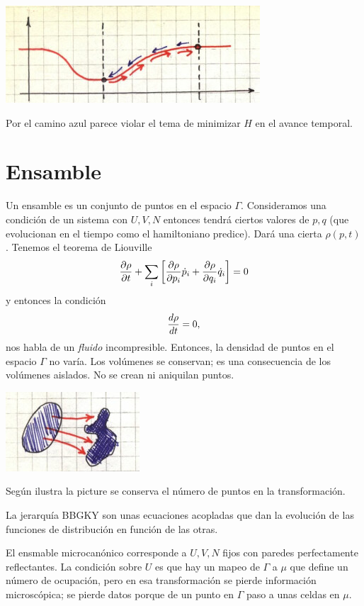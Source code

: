 \documentclass[10pt,oneside]{CBFT_book}
\begin{document}
\includegraphics[scale=0.5]{images/1606329246.jpg}

Por el camino azul parece violar el tema de minimizar $H$ en el avance temporal.

\section{Ensamble}

Un ensamble es un conjunto de puntos en el espacio $\Gamma$.
Consideramos una condición de un sistema con $U,V,N$ entonces tendrá ciertos valores de $p,q$ (que
evolucionan en el tiempo como el hamiltoniano predice). Dará una cierta $\rho(p,t)$.
Tenemos el teorema de Liouville
\[
	\frac{\partial^{\hspace{-0.05em}} {\rho}}{\partial {t}^{\hspace{-0.05em}}} + \sum_i \left[ \frac{\partial^{\hspace{-0.05em}} {\rho}}{\partial {p_i}^{\hspace{-0.05em}}} \dot{p}_i + 
	\frac{\partial^{\hspace{-0.05em}} {\rho}}{\partial {q_i}^{\hspace{-0.05em}}} \dot{q}_i \right] = 0
\]
y entonces la condición
\[
	\frac{d^{\hspace{-0.05em}} {\rho}}{d {t}^{\hspace{-0.05em}}} = 0,
\]
nos habla de un {\it fluido} incompresible.
Entonces, la densidad de puntos en el espacio $\Gamma$ no varía. Los volúmenes se conservan; es una
consecuencia de los volúmenes aislados. No se crean ni aniquilan puntos.

\includegraphics[scale=0.5]{images/1606329250.jpg}

Según ilustra la picture se conserva el número de puntos en la transformación.

La jerarquía BBGKY son unas ecuaciones acopladas que dan la evolución de las funciones de distribución
en función de las otras.

El ensmable microcanónico corresponde a $U,V,N$ fijos con paredes perfectamente reflectantes.
La condición sobre $U$ es que hay un mapeo de $\Gamma$ a $\mu$ que define un número de ocupación,
pero en esa transformación se pierde información microscópica; se pierde datos porque de un punto en
$\Gamma$ paso a unas celdas en $ \mu $.
\end{document}
